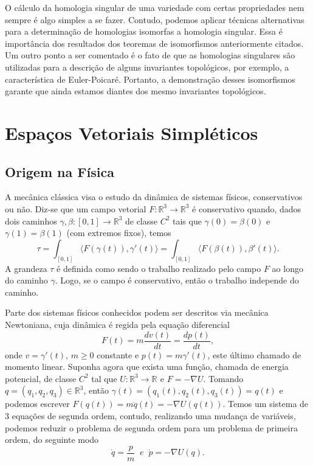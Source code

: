\documentclass[12pt]{book}
\newcommand{\derivada}[2]{\frac{d #1}{d #2}}
\newcommand{\intervalo}{[0,1]}
\newcommand{\produtointerno}[2]{\langle #1, #2 \rangle}
\newcommand{\real}[1]{\mathbb{R}^{#1}}
\newcommand{\reta}{\real{}}
\begin{document}
	O cálculo da homologia singular de uma variedade com certas propriedades nem sempre é algo simples a se fazer. Contudo, podemos aplicar técnicas alternativas para a determinação de homologias isomorfas a homologia singular. Essa é importância dos resultados dos teoremas de isomorfismos anteriormente citados. Um outro ponto a ser comentado é o fato de que as homologias singulares são utilizadas para a descrição de alguns invariantes topológicos, por exemplo, a característica de Euler-Poicaré. Portanto, a demonstração desses isomorfismos garante que ainda estamos diantes dos mesmo invariantes topológicos.
	
	
	\chapter{Espaços Vetoriais Simpléticos}\label{capitulo_espacos_vetoriais_simpleticos}
	
	\section{Origem na Física}
	
	A mecânica clássica visa o estudo da dinâmica de sistemas físicos, conservativos ou não. Diz-se que um campo vetorial $F:\real{3} \to \real{3}$ é conservativo quando, dados dois caminhos $\gamma,\beta:[0,1] \to \real{3}$ de classe $C^{2}$ tais que $\gamma(0)=\beta(0)$ e $\gamma(1)=\beta(1)$ (com extremos fixos), temos
	$$
	\tau=\int_{\intervalo} \produtointerno{F(\gamma(t))}{\gamma'(t)}=
	\int_{\intervalo} \produtointerno{F(\beta(t))}{\beta'(t)}.
	$$
	A grandeza $\tau$ é definida como sendo o trabalho realizado pelo campo $F$ ao longo do caminho $\gamma$. Logo, se o campo é conservativo, então o trabalho independe do caminho.
	
	Parte dos sistemas físicos conhecidos podem ser descritos via mecânica Newtoniana, cuja dinâmica é regida pela equação diferencial 
	$$
	F(t) = m\derivada{v(t)}{t} = \derivada{p(t)}{t},
	$$
	onde $v = \gamma'(t)$, $m\geq0$ constante e $p(t) = m\gamma'(t)$, este último chamado de momento linear. Suponha agora que exista uma função, chamada de energia potencial, de classe $C^{2}$ tal que $U:\real{3}\to \reta$ e $F = -\nabla U$. Tomando $q=(q_{1},q_{2}, q_{3})\in \real{3}$, então $\gamma(t)=(q_{1}(t),q_{2}(t), q_{3}(t)) = q(t)$ e podemos escrever $F(q(t)) =m \ddot{q}(t)= -\nabla U(q(t))$. Temos um sistema de 3 equações de segunda ordem, contudo, realizando uma mudança de variáveis, podemos reduzir o problema de segunda ordem para um problema de primeira ordem, do seguinte modo
	$$
	\dot{q} = \frac{p}{m} \;\; e \;\;\dot{p} = -\nabla U(q).
	$$
	
\end{document}
